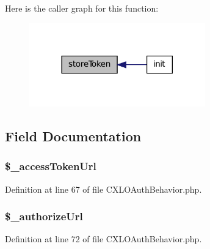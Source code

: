 Here is the caller graph for this function:\nopagebreak
\begin{figure}[H]
\begin{center}
\leavevmode
\includegraphics[width=216pt]{classCXLOAuthBehavior_a8027c4853ebf41108725eb798ebfcd59_icgraph}
\end{center}
\end{figure}




\subsection{Field Documentation}
\hypertarget{classCXLOAuthBehavior_a9c9a16979cab986d2ebc611c942046bb}{
\subsubsection[{\$\_\-accessTokenUrl}]{\setlength{\rightskip}{0pt plus 5cm}\$\_\-accessTokenUrl}}
\label{classCXLOAuthBehavior_a9c9a16979cab986d2ebc611c942046bb}


Definition at line 67 of file CXLOAuthBehavior.php.

\hypertarget{classCXLOAuthBehavior_a394ba62f76b701f6ba696df4d7e025b1}{
\subsubsection[{\$\_\-authorizeUrl}]{\setlength{\rightskip}{0pt plus 5cm}\$\_\-authorizeUrl}}
\label{classCXLOAuthBehavior_a394ba62f76b701f6ba696df4d7e025b1}


Definition at line 72 of file CXLOAuthBehavior.php.

